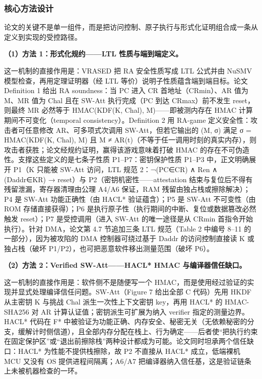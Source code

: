 \documentclass[11pt]{ctexart}
\begin{document}
\subsubsection{核心方法设计}
论文的关键不是单一组件，而是把访问控制、原子执行与形式化证明组合成一条从定义到实现的受控路径。\par
\noindent\textbf{（1）方法 1：形式化规约——LTL 性质与端到端定义。}\par
这一机制的直接作用是：VRASED 把 RA 安全性质写成 LTL 公式并由 NuSMV 模型检查，再用定理证明器（经 LTL 等价）说明子性质蕴含端到端目标。论文 Definition 1 给出 RA soundness：当 PC 进入 CR 首地址（CRmin）、AR 值为 M、MR 值为 Chal 且在 SW-Att 执行完成（PC 到达 CRmax）前不发生 reset，则最终 MR 必然等于 HMAC(KDF(K, Chal), M)——即被测内存在 HMAC 计算期间不可变化（temporal consistency）。Definition 2 用 RA-game 定义安全性：攻击者可任意修改 AR、可多项式次调用 SW-Att，但若它输出的 (M, σ) 满足 σ = HMAC(KDF(K, Chal), M) 且 M ≠ AR(t)（不等于任一调用时刻的真实内存），则攻击者获胜；论文经规约证明，赢得该游戏意味着打破 HMAC 的存在不可伪造性。支撑这些定义的是七条子性质 P1–P7：密钥保护性质 P1–P3 中，正文明确展开 P1（K 只能被 SW-Att 访问，LTL 规范 2：¬(PC∈CR) ∧ Ren ∧ (Daddr∈KR) → reset）与 P2（密钥机密性——attestation 结束与复位后不得有残留泄漏，寄存器清理由公理 A4/A6 保证，RAM 残留由独占栈或擦除解决）；P4 是 SW-Att 功能正确性（由 HACL* 验证蕴含）；P5 是 SW-Att 不可变性（由 ROM 存储直接获得）；P6 是执行原子性（执行期间的中断、复位或数据篡改必然触发 reset）；P7 是受控调用（进入 SW-Att 的唯一途径是从 CRmin 首指令开始执行）。针对 DMA，论文第 4.7 节追加三条 LTL 规范（Table 2 中编号 8–11 的一部分），因为被攻陷的 DMA 控制器可绕过基于 Daddr 的访问控制直接读 K 或独占栈（破坏 P1/P2），也可把恶意软件移出测量范围（破坏 P6）。\par
\noindent\textbf{（2）方法 2：Verified SW-Att——HACL* HMAC 与编译器信任缺口。}\par
这一机制的直接作用是：软件侧不是随便写一个 HMAC，而是使用经过验证的实现并显式处理编译信任问题。SW-Att（Figure 7 给出全部 C 代码）先用 HKDF 从主密钥 K 与挑战 Chal 派生一次性上下文密钥 key，再用 HACL* 的 HMAC-SHA256 对 AR 计算认证值；密钥派生可扩展为纳入 verifier 指定的测量边界。HACL* 代码在 F* 中被验证为功能正确、内存安全、秘密无关（无依赖秘密的分支，缓解计时侧信道），且全部内存分配在栈上、行为确定——后者使“把执行约束在固定保护区”或“退出前擦除栈”两种设计都成为可能。论文同时坦承两个信任缺口：HACL* 为性能不提供栈擦除，故 P2 不直接从 HACL* 成立，低端裸机 MCU 又没有 OS 提供进程间隔离；A6/A7 把编译器纳入信任基，这是验证链条上未被机器检查的一环。\par
\end{document}
